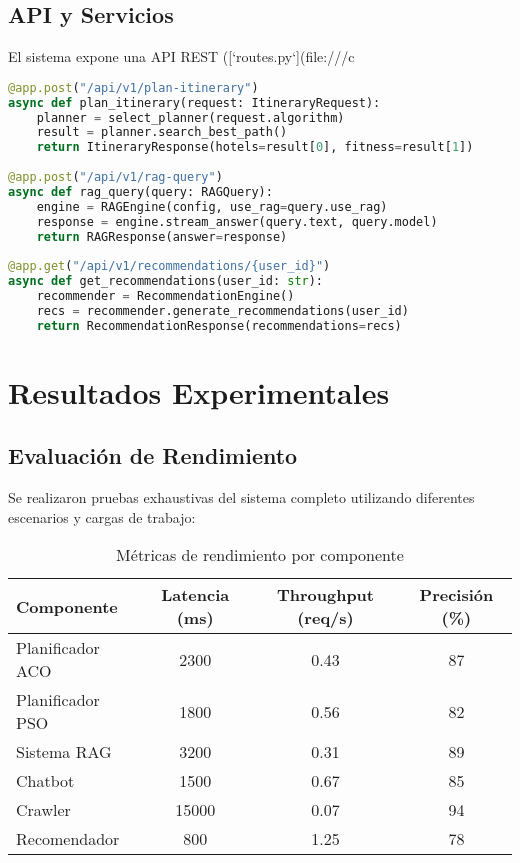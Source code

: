 \documentclass[runningheads]{llncs}
\begin{document}
\subsection{API y Servicios}

El sistema expone una API REST ([`routes.py`](file:///c%

\begin{lstlisting}[language=Python, caption=Endpoints principales de la API]
@app.post("/api/v1/plan-itinerary")
async def plan_itinerary(request: ItineraryRequest):
    planner = select_planner(request.algorithm)
    result = planner.search_best_path()
    return ItineraryResponse(hotels=result[0], fitness=result[1])
    
@app.post("/api/v1/rag-query")
async def rag_query(query: RAGQuery):
    engine = RAGEngine(config, use_rag=query.use_rag)
    response = engine.stream_answer(query.text, query.model)
    return RAGResponse(answer=response)
    
@app.get("/api/v1/recommendations/{user_id}")
async def get_recommendations(user_id: str):
    recommender = RecommendationEngine()
    recs = recommender.generate_recommendations(user_id)
    return RecommendationResponse(recommendations=recs)
\end{lstlisting}

\section{Resultados Experimentales}

\subsection{Evaluación de Rendimiento}

Se realizaron pruebas exhaustivas del sistema completo utilizando diferentes escenarios y cargas de trabajo:

\begin{table}[H]
\centering
\begin{tabular}{lccc}
\toprule
\textbf{Componente} & \textbf{Latencia (ms)} & \textbf{Throughput (req/s)} & \textbf{Precisión (\%)} \\
\midrule
Planificador ACO & 2300 & 0.43 & 87 \\
Planificador PSO & 1800 & 0.56 & 82 \\
Sistema RAG & 3200 & 0.31 & 89 \\
Chatbot & 1500 & 0.67 & 85 \\
Crawler & 15000 & 0.07 & 94 \\
Recomendador & 800 & 1.25 & 78 \\
\bottomrule
\end{tabular}
\caption{Métricas de rendimiento por componente}
\end{table}
\end{document}
